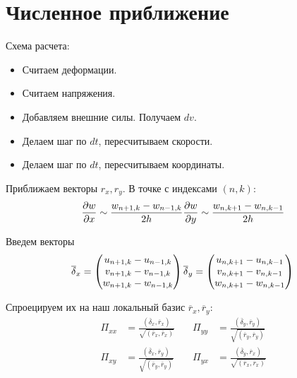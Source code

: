 \documentclass[12pt,a4paper,fleqn]{article}
\begin{document}
\clearpage

\section{Численное приближение}

Схема расчета:
\begin{itemize}
	\item Считаем деформации.
	\item Считаем напряжения.
	\item Добавляем внешние силы. Получаем $dv$.
	\item Делаем шаг по $dt$, пересчитываем скорости.
	\item Делаем шаг по $dt$, пересчитываем координаты.
\end{itemize}

Приближаем векторы $r_x, r_y$. В точке с индексами $(n, k)$:
\begin{equation}
	\frac{\partial w}{\partial x} \sim \frac{w_{n+1,k} - w_{n-1, k}}{2h} \\
	\frac{\partial w}{\partial y} \sim \frac{w_{n,k+1} - w_{n, k-1}}{2h}
\end{equation}

Введем векторы 
\begin{equation}
	\overline{\delta}_x = \begin{pmatrix}
				u_{n+1, k} - u_{n-1,k} \\
				v_{n+1, k} - v_{n-1,k} \\
				w_{n+1, k} - w_{n-1,k} 
				\end{pmatrix} \\
	\overline{\delta}_y = \begin{pmatrix}
				u_{n, k+1} - u_{n,k-1} \\
				v_{n, k+1} - v_{n,k-1} \\
				w_{n, k+1} - w_{n,k-1} 
				\end{pmatrix} \\
\end{equation}

Спроецируем их на наш локальный базис $\overline{r}_x, \overline{r}_y$:
\begin{align}
	\Pi_{xx} &= \frac{(\overline{\delta}_x, \overline{r}_x)}{\sqrt{(\overline{r}_x, \overline{r}_x)}} &\quad 
		\Pi_{yy} &= \frac{(\overline{\delta}_y, \overline{r}_y)}{\sqrt{(\overline{r}_y, \overline{r}_y)}} \\
	\Pi_{xy} &= \frac{(\overline{\delta}_x, \overline{r}_y)}{\sqrt{(\overline{r}_y, \overline{r}_y)}} &\quad 
		\Pi_{yx} &= \frac{(\overline{\delta}_y, \overline{r}_x)}{\sqrt{(\overline{r}_x, \overline{r}_x)}} 
\end{align}
\end{document}
